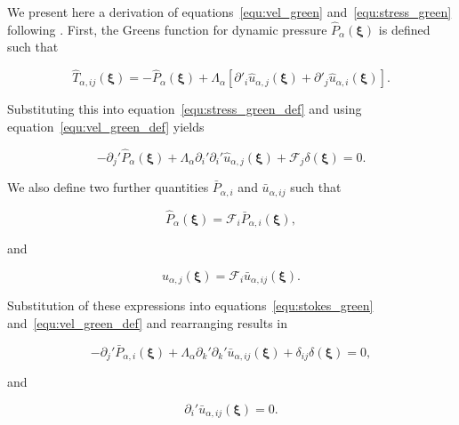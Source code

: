 \documentclass[12pt]{article}
\begin{document}
We present here a derivation of equations~\ref{equ:vel_green} and~\ref{equ:stress_green} following \citet{Ladyzhenskaya63}. First, the Greens function for dynamic pressure $\hat{P}_{\alpha}(\boldsymbol{\xi})$ is defined such that

\begin{equation}
\label{equ:press_green_def}
\hat{T}_{\alpha, ij}(\boldsymbol{\xi}) = - \hat{P}_{\alpha}(\boldsymbol{\xi}) + \Lambda_{\alpha}[\partial'_{i} \hat{u}_{\alpha,j}(\boldsymbol{\xi}) + \partial'_{j} \hat{u}_{\alpha,i}(\boldsymbol{\xi})] .
\end{equation}


Substituting this into equation~\ref{equ:stress_green_def} and using equation~\ref{equ:vel_green_def} yields 

\begin{equation}
\label{equ:stokes_green}
-\partial_{j}' \hat{P}_{\alpha}(\boldsymbol{\xi}) + \Lambda_{\alpha} \partial_{i}' \partial_{i}' \hat{u}_{\alpha,j}(\boldsymbol{\xi}) + \mathcal{F}_{j} \delta(\boldsymbol{\xi}) = 0 .
\end{equation}


We also define two further quantities $\bar{P}_{\alpha, i}$ and $\bar{u}_{\alpha,ij}$ such that

\begin{equation}
\label{equ:pres_bar}
\hat{P}_{\alpha} (\boldsymbol{\xi}) = \mathcal{F}_{i} \bar{P}_{\alpha, i} (\boldsymbol{\xi}) ,
\end{equation}

and 

\begin{equation}
\label{equ:vel_bar}
\hat{u}_{\alpha,j}(\boldsymbol{\xi}) = \mathcal{F}_{i} \bar{u}_{\alpha,ij} (\boldsymbol{\xi}) .
\end{equation}

Substitution of these expressions into equations~\ref{equ:stokes_green} and~\ref{equ:vel_green_def} and rearranging results in

\begin{equation}
\label{equ:stokes_bar}
-\partial_{j}' \bar{P}_{\alpha, i} (\boldsymbol\xi) + \Lambda_{\alpha} \partial_{k}' \partial_{k}' \bar{u}_{\alpha,ij} (\boldsymbol\xi) + \delta_{ij} \delta(\boldsymbol\xi) = 0 ,
\end{equation}

and

\begin{equation}
\label{equ:cont_bar}
\partial_{i}' \bar{u}_{\alpha,ij} (\boldsymbol\xi)  = 0 .
\end{equation}
\end{document}
